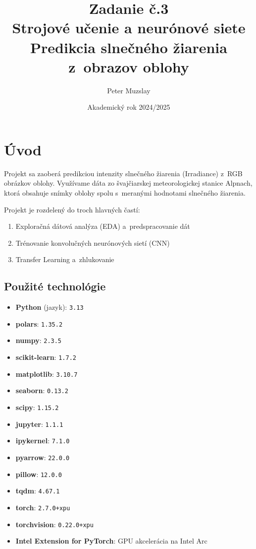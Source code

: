 \documentclass[a4paper, 12pt]{article}
\title{Zadanie č.3 \\ Strojové učenie a neurónové siete \\ Predikcia slnečného žiarenia z~obrazov oblohy}
\author{Peter Muzslay}
\date{Akademický rok 2024/2025}
\begin{document}
\maketitle
\clearpage
\tableofcontents
\clearpage

\section{Úvod}

Projekt sa zaoberá predikciou intenzity slnečného žiarenia (Irradiance) z~RGB obrázkov oblohy. Využívame dáta zo švajčiarskej meteorologickej stanice Alpnach, ktorá obsahuje snímky oblohy spolu s~meranými hodnotami slnečného žiarenia.

Projekt je rozdelený do troch hlavných častí:
\begin{enumerate}
    \item Exploračná dátová analýza (EDA) a~predspracovanie dát
    \item Trénovanie konvolučných neurónových sietí (CNN)
    \item Transfer Learning a~zhlukovanie
\end{enumerate}

\subsection{Použité technológie}

\begin{itemize}
    \item \textbf{Python} (jazyk): \texttt{3.13}
    \item \textbf{polars}: \texttt{1.35.2}
    \item \textbf{numpy}: \texttt{2.3.5}
    \item \textbf{scikit-learn}: \texttt{1.7.2}
    \item \textbf{matplotlib}: \texttt{3.10.7}
    \item \textbf{seaborn}: \texttt{0.13.2}
    \item \textbf{scipy}: \texttt{1.15.2}
    \item \textbf{jupyter}: \texttt{1.1.1}
    \item \textbf{ipykernel}: \texttt{7.1.0}
    \item \textbf{pyarrow}: \texttt{22.0.0}
    \item \textbf{pillow}: \texttt{12.0.0}
    \item \textbf{tqdm}: \texttt{4.67.1}
    \item \textbf{torch}: \texttt{2.7.0+xpu}
    \item \textbf{torchvision}: \texttt{0.22.0+xpu}
    \item \textbf{Intel Extension for PyTorch}: GPU akcelerácia na Intel Arc
\end{itemize}
\end{document}
